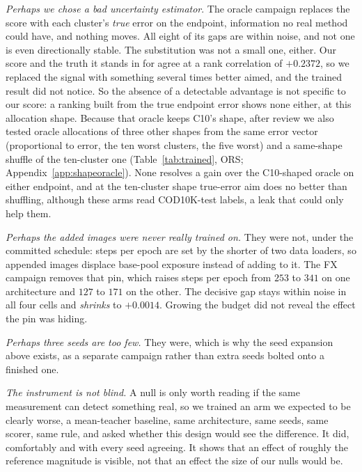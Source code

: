 \documentclass{article}
\newif\ifrevmarked \revmarkedtrue
\DeclareRobustCommand{\revB}[1]{\ifrevmarked{\color{RevB}#1}\else{#1}\fi}
\DeclareRobustCommand{\revShared}[1]{\ifrevmarked{\color{RevShared}#1}\else{#1}\fi}
\begin{document}
\emph{Perhaps we chose a bad uncertainty estimator}. The oracle campaign replaces the score with each cluster's \emph{true} error on the endpoint, information no real method could have, and nothing moves. All eight of its gaps are within noise, and not one is even directionally stable.
The substitution was not a small one, either. Our score and the truth it stands in for agree at a
rank correlation of $+0.2372$, so we replaced the signal with something several times better aimed, and the trained result did not notice. \revShared{So the absence of a detectable advantage is not specific to our score: a ranking built from the true endpoint error shows none either, at this allocation shape.} \revB{Because that oracle keeps C10's shape, after review we also tested oracle allocations of three other shapes from the same error vector (proportional to error, the ten worst clusters, the five worst) and a same-shape shuffle of the ten-cluster one (Table~\ref{tab:trained}, ORS; Appendix~\ref{app:shapeoracle}). None resolves a gain over the C10-shaped oracle on either endpoint, and at the ten-cluster shape true-error aim does no better than shuffling, although these arms read COD10K-test labels, a leak that could only help them.}

\emph{Perhaps the added images were never really trained on.} They were not, under the committed
schedule: steps per epoch are set by the shorter of two data loaders, so appended images displace
base-pool exposure instead of adding to it. The FX campaign removes that pin, which raises steps per
epoch from $253$ to $341$ on one architecture and $127$ to $171$ on the other. The decisive gap
stays within noise in all four cells and \emph{shrinks} to $+0.0014$. Growing the budget did not
reveal the effect the pin was hiding.

\emph{Perhaps three seeds are too few.} They were, which is why the seed expansion above exists, as a
separate campaign rather than extra seeds bolted onto a finished one.

\emph{The instrument is not blind.} A null is only worth reading if the same measurement can
detect something real, so we trained an arm we expected to be clearly worse, a mean-teacher
baseline, same architecture, same seeds, same scorer, same rule, and asked whether this design
would see the difference. It did, comfortably and with every seed agreeing. It shows that an effect of roughly the reference magnitude is visible, not that an effect the size of our nulls would be.
\end{document}
